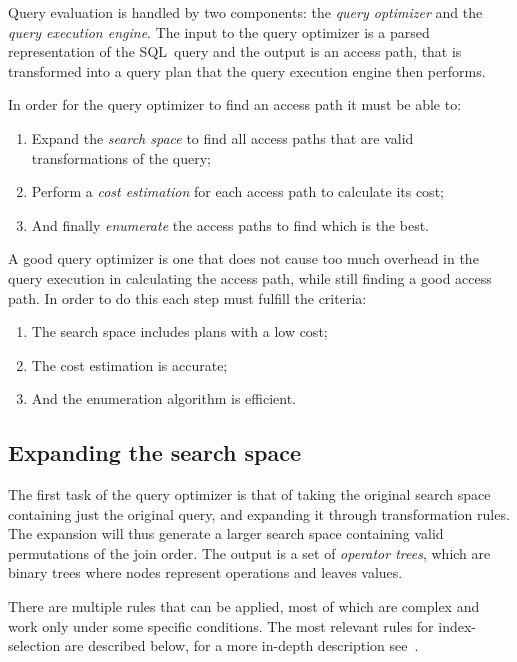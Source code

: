 Query evaluation is handled by two components: the \textit{query optimizer} and
the \textit{query execution engine}. The input to the query optimizer is a
parsed representation of the SQL~query and the output is an access path, that is
transformed into a query plan that the query execution engine then performs.

In order for the query optimizer to find an access path it must be able to:
\begin{enumerate}
\item Expand the \textit{search space} to find all access paths that are valid
  transformations of the query;
\item Perform a \textit{cost estimation} for each access path to calculate its
  cost;
\item And finally \textit{enumerate} the access paths to find which is the best.
\end{enumerate}

A good query optimizer is one that does not cause too much overhead in the query
execution in calculating the access path, while still finding a good access
path. In order to do this each step must fulfill the criteria:
\begin{enumerate}
\item The search space includes plans with a low cost;
\item The cost estimation is accurate;
\item And the enumeration algorithm is efficient.
\end{enumerate}

\subsection{Expanding the search space}
The first task of the query optimizer is that of taking the original search
space containing just the original query, and expanding it through
transformation rules. The expansion will thus generate a larger search space
containing valid permutations of the join order. The output is a set of
\textit{operator trees}, which are binary trees where nodes represent operations
and leaves values.

There are multiple rules that can be applied, most of which are complex and work
only under some specific conditions. The most relevant rules for index-selection
are described below, for a more in-depth description
see~\cite{chaudhuri_1998_overview_aooqoirs}.

